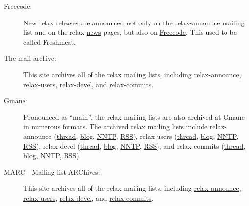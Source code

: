 \begin{description}
  \item[Freecode:]  New relax releases are announced not only on the \href{https://mail.gna.org/public/relax-announce/}{relax-announce} mailing list and on the relax \href{https://gna.org/news/?group=relax}{news} pages, but also on \href{http://freecode.com/projects/nmr-relax}{Freecode}.
    This used to be called Freshmeat.
  \item[The mail archive:]  This site archives all of the relax mailing lists, including \href{http://mail-archive.com/relax-announce@gna.org/}{relax-announce}, \href{http://mail-archive.com/relax-users@gna.org/}{relax-users}, \href{http://mail-archive.com/relax-devel@gna.org/}{relax-devel}, and \href{http://mail-archive.com/relax-commits@gna.org/}{relax-commits}.
  \item[Gmane:]  Pronounced as ``main'', the relax mailing lists are also archived at Gmane in numerous formats.
    The archived relax mailing lists include relax-announce (\href{http://news.gmane.org/gmane.science.nmr.relax.announce}{thread}, \href{http://blog.gmane.org/gmane.science.nmr.relax.announce}{blog}, \href{nntp://news.gmane.org/gmane.science.nmr.relax.announce}{NNTP}, \href{http://rss.gmane.org/messages/excerpts/gmane.science.nmr.relax.announce}{RSS}), relax-users (\href{http://news.gmane.org/gmane.science.nmr.relax.user}{thread}, \href{http://blog.gmane.org/gmane.science.nmr.relax.user}{blog}, \href{nntp://news.gmane.org/gmane.science.nmr.relax.user}{NNTP}, \href{http://rss.gmane.org/messages/excerpts/gmane.science.nmr.relax.user}{RSS}), relax-devel (\href{http://news.gmane.org/gmane.science.nmr.relax.devel}{thread}, \href{http://blog.gmane.org/gmane.science.nmr.relax.devel}{blog}, \href{nntp://news.gmane.org/gmane.science.nmr.relax.devel}{NNTP}, \href{http://rss.gmane.org/messages/excerpts/gmane.science.nmr.relax.devel}{RSS}), and relax-commits (\href{http://news.gmane.org/gmane.science.nmr.relax.scm}{thread}, \href{http://blog.gmane.org/gmane.science.nmr.relax.scm}{blog}, \href{nntp://news.gmane.org/gmane.science.nmr.relax.scm}{NNTP}, \href{http://rss.gmane.org/messages/excerpts/gmane.science.nmr.relax.scm}{RSS}).
  \item[MARC -  Mailing list ARChives:]  This site archives all of the relax mailing lists, including \href{http://marc.info/?l=relax-announce&r=1&w=2}{relax-announce}, \href{http://marc.info/?l=relax-users&r=1&w=2}{relax-users}, \href{http://marc.info/?l=relax-devel&r=1&w=2}{relax-devel}, and \href{http://marc.info/?l=relax-commits&r=1&w=2}{relax-commits}.

\end{description}
